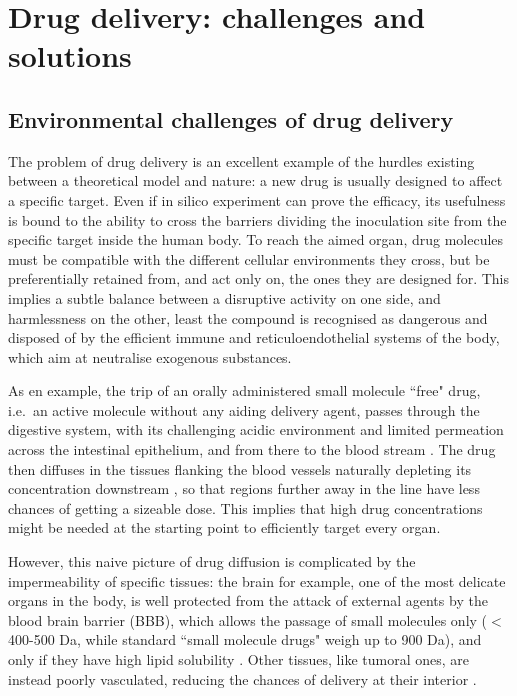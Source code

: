 \section{Drug delivery: challenges and solutions}

\subsection{Environmental challenges of drug delivery}
The problem of drug delivery is an excellent example of the hurdles existing between a theoretical model and nature: a new drug is usually designed to affect a specific target. Even if in silico experiment can prove the efficacy, its usefulness is bound to the ability to cross the barriers dividing the inoculation site from the specific target inside the human body.
%
To reach the aimed organ, drug molecules must be compatible with the different cellular environments they cross, but be preferentially retained from, and act only on, the ones they are designed for. This implies a subtle balance between a disruptive activity on one side, and harmlessness on the other, least the compound is recognised as dangerous and disposed of by the efficient immune and reticuloendothelial systems of the body, which aim at neutralise exogenous substances.

As en example, the trip of an orally  administered small molecule ``free" drug, i.e.\ an active molecule without any aiding delivery agent, passes through the digestive system, with its challenging acidic environment and limited permeation across the intestinal epithelium, and from there to the blood stream \cite{Masaoka2006, Mitragotri2014}. The drug then diffuses in the tissues flanking the blood vessels naturally depleting its concentration downstream \cite{Krol2012}, so that regions further away in the line have less chances of getting a sizeable dose. This implies that high drug concentrations might be needed at the starting point to efficiently target every organ.

However, this naive picture of drug diffusion is complicated by the impermeability of specific tissues: the brain for example, one of the most delicate organs in the body, is well protected from the attack of external agents by the blood brain barrier (BBB), which allows the passage of small molecules only ($<$ 400-500 Da, while standard ``small molecule drugs" weigh up to 900 Da), and only if they have high lipid solubility \cite{Pattni2015, Krol2012}. Other tissues, like tumoral ones, are instead poorly vasculated, reducing the chances of delivery at their interior \cite{Pattni2015}.

